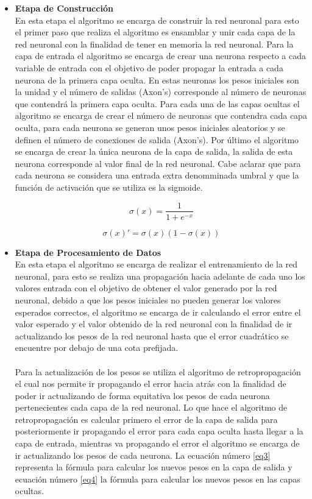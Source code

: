 \documentclass[letterpaper, 10 pt, conference]{ieeeconf}
\begin{document}
\begin{itemize}[leftmargin=*]
    \item \textbf{Etapa de Construcción}
    \\ En esta etapa el algoritmo se encarga de construir la red neuronal para esto el primer paso que realiza el algoritmo es ensamblar y unir cada capa de la red neuronal con la finalidad de tener en memoria la red neuronal. Para la capa de entrada el algoritmo se encarga de crear una neurona respecto a cada variable de entrada con el objetivo de poder propagar la entrada a cada neurona de la primera capa oculta. En estas neuronas los pesos iniciales son la unidad y el número de salidas (Axon's) corresponde al número de neuronas que contendrá la primera capa oculta. Para cada una de las capas ocultas el algoritmo se encarga de crear el número de neuronas que contendra cada capa oculta, para cada neurona se generan unos pesos iniciales aleatorios y se definen el número de conexiones de salida (Axon's). Por último el algoritmo se encarga de crear la única neurona de la capa de salida, la salida de esta neurona corresponde al valor final de la red neuronal. Cabe aclarar que para cada neurona se considera una entrada extra denomminada umbral y que la función de activación que se utiliza es la sigmoide.
    
    \begin{equation}
        \sigma(x) = \frac{1}{1+e^{-x}}
    \end{equation}
    
    \begin{equation}
        \sigma(x)' = \sigma(x)(1-\sigma(x))
    \end{equation}

    \item \textbf{Etapa de Procesamiento de Datos}
    \\En esta etapa el algoritmo se encarga de realizar el entrenamiento de la red neuronal, para esto se realiza una propagación hacia adelante de cada uno los valores entrada con el objetivo de obtener el valor generado por la red neuronal, debido a que los pesos iniciales no pueden generar los valores esperados correctos, el algoritmo se encarga de ir calculando el error entre el valor esperado y el valor obtenido de la red neuronal con la finalidad de ir actualizando los pesos de la red neuronal hasta que el error cuadrático se encuentre por debajo de una cota prefijada.\\\\ Para la actualización de los pesos se utiliza el algoritmo de retropropagación el cual nos permite ir propagando el error hacia atrás con la finalidad de poder ir actualizando de forma equitativa los pesos de cada neurona pertenecientes cada capa de la red neuronal. Lo que hace el algoritmo de retropropagación es calcular primero el error de la capa de salida para posteriormente ir propagando el error para cada capa oculta hasta llegar a la capa de entrada, mientras va propagando el error el algoritmo se encarga de ir actualizando los pesos de cada neurona. La ecuación número \ref{eq3} representa la fórmula para calcular los nuevos pesos en la capa de salida y ecuación número \ref{eq4} la fórmula para calcular los nuevos pesos en las capas ocultas.
    

\end{itemize}
\end{document}
